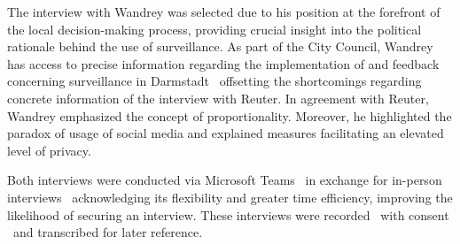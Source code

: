 \documentclass[12pt]{article}
\begin{document}
	The interview with Wandrey was selected due to his position at the forefront of the local decision-making process, providing crucial insight into the political rationale behind the use of surveillance. As part of the City Council, Wandrey has access to precise information regarding the implementation of and feedback concerning surveillance in Darmstadt \textemdash\ offsetting the shortcomings regarding concrete information of the interview with Reuter. In agreement with Reuter, Wandrey emphasized the concept of proportionality. Moreover, he highlighted the paradox of usage of social media and explained measures facilitating an elevated level of privacy.
	
	Both interviews were conducted via Microsoft Teams \textemdash\ in exchange for in-person interviews \textemdash\ acknowledging its flexibility and greater time efficiency, improving the likelihood of securing an interview. These interviews were recorded \textemdash\ with consent \textemdash\ and transcribed for later reference.
	
	
	
	
	
	
	
		
	
	
	
	
	
	
	
	
	
	\clearpage
	
	\printbibliography
	
\end{document}
